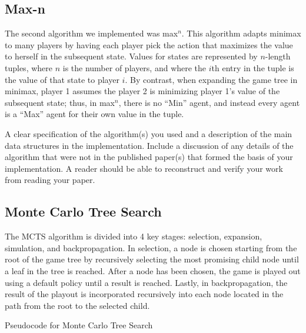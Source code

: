 \documentclass[11pt]{article}
\begin{document}
\subsection{Max-n}

The second algorithm we implemented was max$^n$. This algorithm adapts minimax to many players by having each player pick the action that maximizes the value to herself in the subsequent state. Values for states are represented by $n$-length tuples, where $n$ is the number of players, and where the $i$th entry in the tuple is the value of that state to player $i$. By contrast, when expanding the game tree in minimax, player 1 assumes the player 2 is minimizing player 1's value of the subsequent state; thus, in max$^n$, there is no ``Min'' agent, and instead every agent is a ``Max'' agent for their own value in the tuple.


A clear specification of the algorithm(s) you used and a description
of the main data structures in the implementation. Include a
discussion of any details of the algorithm that were not in the
published paper(s) that formed the basis of your implementation. A
reader should be able to reconstruct and verify your work from reading
your paper.
\subsection{Monte Carlo Tree Search}




The MCTS algorithm is divided into 4 key stages: selection, expansion, simulation, and backpropagation. In selection, a node is chosen starting from the root of the game tree by recursively selecting the most promising child node until a leaf in the tree is reached. After a node has been chosen, the game is played out using a default policy until a result is reached. Lastly, in backpropagation, the result of the playout is incorporated recursively into each node located in the path from the root to the selected child.\\

\begin{algorithm}
  \begin{algorithmic}
	\EndWhile{}
    \EndProcedure{}
  \end{algorithmic}
  \caption{Pseudocode for Monte Carlo Tree Search}
\end{algorithm}
\end{document}
